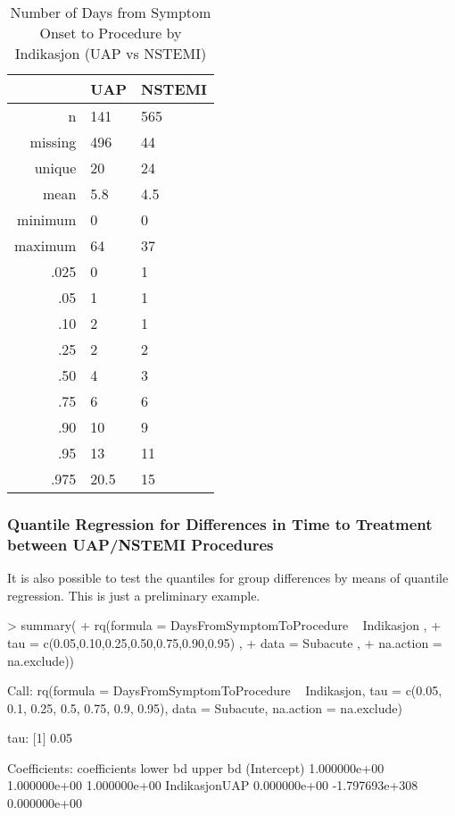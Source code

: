 \documentclass[a4paper]{report}
\begin{document}
\begin{itemize}
{%
\begin{table}[ht]
\centering
\begin{tabular}{rll}
  \toprule
 & UAP & NSTEMI \\ 
  \midrule
n & 141 & 565 \\ 
  missing & 496 & 44 \\ 
  unique & 20 & 24 \\ 
  mean & 5.8 & 4.5 \\ 
  minimum & 0 & 0 \\ 
  maximum & 64 & 37 \\ 
  .025 & 0 & 1 \\ 
  .05 & 1 & 1 \\ 
  .10 & 2 & 1 \\ 
  .25 & 2 & 2 \\ 
  .50 & 4 & 3 \\ 
  .75 & 6 & 6 \\ 
  .90 & 10 & 9 \\ 
  .95 & 13 & 11 \\ 
  .975 & 20.5 & 15 \\ 
   \bottomrule
\end{tabular}
\caption{Number of Days from Symptom Onset to Procedure by Indikasjon (UAP vs NSTEMI)} 
\label{Summary_Symptom_to_Procedure_by_Indikasjon}
\end{table}

\clearpage
\subsubsection{Quantile Regression for Differences in Time to Treatment between UAP/NSTEMI Procedures}
It is also possible to test the quantiles for group differences by means of quantile regression. This is just a preliminary example.
\begin{Schunk}
\begin{Sinput}
> summary(
+     rq(formula = DaysFromSymptomToProcedure ~ Indikasjon ,
+        tau = c(0.05,0.10,0.25,0.50,0.75,0.90,0.95) ,
+        data = Subacute ,
+        na.action = na.exclude))
\end{Sinput}
\begin{Soutput}
Call: rq(formula = DaysFromSymptomToProcedure ~ Indikasjon, tau = c(0.05, 
    0.1, 0.25, 0.5, 0.75, 0.9, 0.95), data = Subacute, na.action = na.exclude)

tau: [1] 0.05

Coefficients:
              coefficients   lower bd       upper bd      
(Intercept)     1.000000e+00   1.000000e+00   1.000000e+00
IndikasjonUAP   0.000000e+00 -1.797693e+308   0.000000e+00


\end{Soutput}
\end{Schunk}}
\end{itemize}
\end{document}
